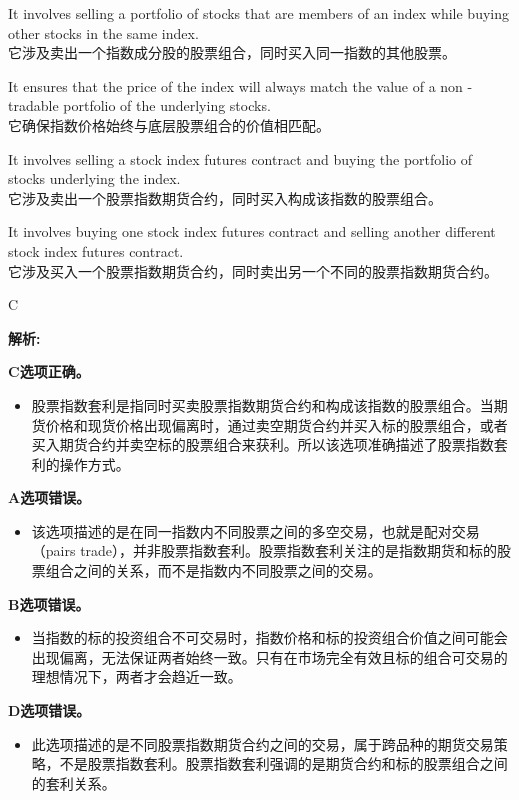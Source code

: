 \documentclass{article}
\newenvironment{explanation}
{\textbf{解析:}\par}
{\par}
\begin{document}
    \begin{choices}
        \item It involves selling a portfolio of stocks that are members of an index while buying other stocks in the same index.\\
        它涉及卖出一个指数成分股的股票组合，同时买入同一指数的其他股票。
        \item It ensures that the price of the index will always match the value of a non - tradable portfolio of the underlying stocks.\\
        它确保指数价格始终与底层股票组合的价值相匹配。
        \item It involves selling a stock index futures contract and buying the portfolio of stocks underlying the index.\\
        它涉及卖出一个股票指数期货合约，同时买入构成该指数的股票组合。
        \item It involves buying one stock index futures contract and selling another different stock index futures contract.\\
        它涉及买入一个股票指数期货合约，同时卖出另一个不同的股票指数期货合约。
    \end{choices}
    
    \begin{correctanswer}
        C
    \end{correctanswer}
    
    \begin{explanation}
    \textbf{C选项正确。}
    \begin{itemize}
        \item 股票指数套利是指同时买卖股票指数期货合约和构成该指数的股票组合。当期货价格和现货价格出现偏离时，通过卖空期货合约并买入标的股票组合，或者买入期货合约并卖空标的股票组合来获利。所以该选项准确描述了股票指数套利的操作方式。
    \end{itemize}
    \textbf{A选项错误。}
    \begin{itemize}
        \item 该选项描述的是在同一指数内不同股票之间的多空交易，也就是配对交易（pairs trade），并非股票指数套利。股票指数套利关注的是指数期货和标的股票组合之间的关系，而不是指数内不同股票之间的交易。
    \end{itemize}
    \textbf{B选项错误。}
    \begin{itemize}
        \item 当指数的标的投资组合不可交易时，指数价格和标的投资组合价值之间可能会出现偏离，无法保证两者始终一致。只有在市场完全有效且标的组合可交易的理想情况下，两者才会趋近一致。
    \end{itemize}
    \textbf{D选项错误。}
    \begin{itemize}
        \item 此选项描述的是不同股票指数期货合约之间的交易，属于跨品种的期货交易策略，不是股票指数套利。股票指数套利强调的是期货合约和标的股票组合之间的套利关系。
    \end{itemize}
    \end{explanation}
    
\end{document}
